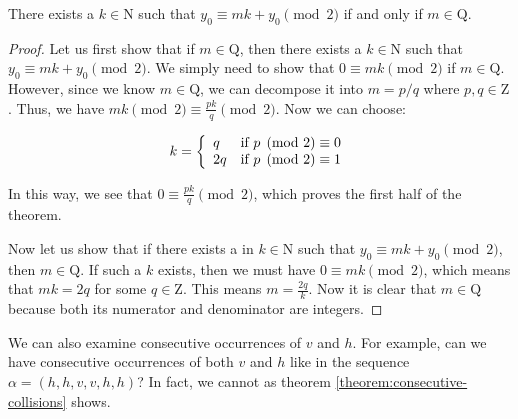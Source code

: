\begin{theorem}
  \label{theorem:periodicity}
  There exists a $k \in \mathrm{N}$ such that $y_0 \equiv mk + y_0 \pmod{2}$ if and only if $m \in \mathrm{Q}$.
\end{theorem}
\begin{proof}
  Let us first show that if $m \in \mathrm{Q}$, then there exists a $k \in \mathrm{N}$ such that $y_0 \equiv mk + y_0 \pmod{2}$. We simply need to show that $0 \equiv mk \pmod{2}$ if $m \in \mathrm{Q}$. However, since we know $m \in \mathrm{Q}$, we can decompose it into $m = p/q$ where $p,q \in \mathrm{Z}$. Thus, we have $mk \pmod{2} \equiv \frac{pk}{q} \pmod{2}$. Now we can choose:

  \begin{align}
    k = \left\{\begin{array}{l c}
      q & \textrm{if } p \pmod{2} \equiv 0 \\
      2q & \textrm{if } p \pmod{2} \equiv 1
    \end{array}\right.
  \end{align}

  In this way, we see that $0 \equiv \frac{pk}{q} \pmod{2}$, which proves the first half of the theorem.

  Now let us show that if there exists a in $k \in \mathrm{N}$ such that $y_0 \equiv mk + y_0 \pmod{2}$, then $m \in \mathrm{Q}$. If such a $k$ exists, then we must have $0 \equiv mk \pmod{2}$, which means that $mk = 2q$ for some $q \in \mathrm{Z}$. This means $m = \frac{2q}{k}$. Now it is clear that $m \in \mathrm{Q}$ because both its numerator and denominator are integers.
\end{proof}

We can also examine consecutive occurrences of $v$ and $h$. For example, can we have consecutive occurrences of both $v$ and $h$ like in the sequence $\alpha = (h, h, v, v, h, h)$? In fact, we cannot as theorem \ref{theorem:consecutive-collisions} shows.

